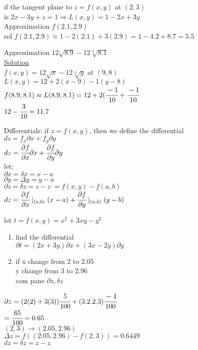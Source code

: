\begin{example}
if the tangent plane to $z=f(x,y)$ at $(2,3)$\\
is $2x-3y+z=1\Rightarrow L(x,y)=1-2x+3y$\\
Approximation $f(2.1,2.9)$\\
sol $f(2.1,2.9)\approx 1-2(2.1)+3(2.9)=1-4.2+8.7=5.5$
\end{example}
\noindent{\color{smalt(darkpowderblue)}\rule{\linewidth}{.2mm}}

\begin{example}
Approximation $12\sqrt{8.9}-12\sqrt[3]{8.1}$\\
\underline{\textbf{\large}\color{smalt(darkpowderblue)}Solution}\\
$f(x,y)=12\sqrt{x}-12\sqrt[3]{y}$ at $(9,8)$\\
$L(x,y)=12+2(x-9)-1(y-8)$\\
$f(8.9,8.1)\approx L(8.9,8.1)=12+2(\cfrac{-1}{10}+\cfrac{-1}{10}$\\
$12-\cfrac{3}{10}=11.7$
\end{example}
\begin{definition}
Differentials: if $ z=f(x,y) $, then we define the differential \\
$dz=f_x \partial x + f_y \partial y $\\
$dz=\cfrac{\partial f}{\partial x} \partial x+\cfrac{\partial f} {\partial y }\partial y$\\
let:\\
$\partial x = \delta x = x-a $\\
$ \partial y = \Delta y = y-a $\\
$ \partial z =\delta z = z - z\cdot = f(x,y) - f(a,b)$\\
$ dz = \cfrac{\partial f} {\partial x}\mid_{(a,b)} (x-a) + \cfrac{\partial f}{\partial y}\mid_{(a,b)}(y-b)$
\end{definition}
\noindent{\color{smalt(darkpowderblue)}\rule{\linewidth}{.2mm}}
\begin{example}
let $t=f(x,y)=x^{2}+3xy-y^{2}$
\begin{enumerate}
    \item find the differential\\
    $\partial t = (2x + 3y) \partial x + (3x - 2y) \partial y$\\
    \item if x change from 2 to 2.05\\
    y change from 3 to 2.96 \\
    com pane $\partial z , \delta z$
\end{enumerate}
$\partial z = (2(2) + 3(3)) \cfrac{5}{100} + (3.2.2.3)\cfrac{-4}{100}$\\
$=\cfrac{65}{100} = 0.65 $\\
$(2,3)\rightarrow (2.05,2.96)$\\
$\Delta z = f((2.05,2.96)-f(2,3)) = 0.6449 $\\
$dz = \delta z = z - z_\cdot$\\
\end{example}
